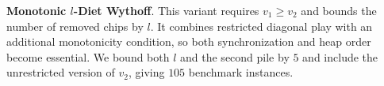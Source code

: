 \documentclass[review]{elsarticle}
\newcommand{\set}[1]{\{ #1 \}}
\newcommand{\tuple}[1]{\langle {#1} \rangle}
\newcommand{\true}{\top}
\newcommand{\statevar}{\mathcal{X}}
\newcommand{\act}{\mathcal{A}}
\newcommand{\constraint}{\mathcal{C}}
\newcommand{\estate}{\mathcal{E}}
\newcommand{\pre}{\mathtt{pre}}
\newcommand{\eff}{\mathtt{eff}}
\begin{document}
{\color{red}\textbf{Monotonic $l$-Diet Wythoff}. This variant requires $v_1 \ge v_2$ and bounds the number of removed chips by $l$.}
{\color{red}It combines restricted diagonal play with an additional monotonicity condition, so both synchronization and heap order become essential.}
{\color{red}We bound both $l$ and the second pile by $5$ and include the unrestricted version of $v_2$, giving $105$ benchmark instances.}
\end{document}
